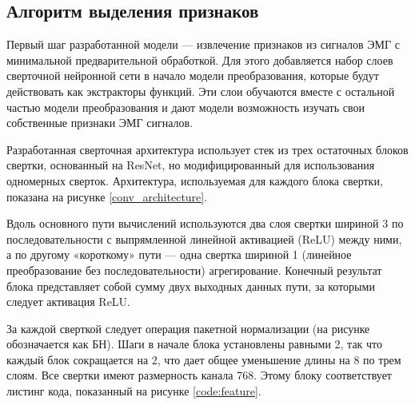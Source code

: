 \subsection{Алгоритм выделения признаков}

Первый шаг разработанной модели — извлечение признаков из сигналов ЭМГ с минимальной предварительной обработкой. Для этого добавляется набор слоев сверточной нейронной сети в начало модели преобразования, которые будут действовать как экстракторы функций. Эти слои обучаются вместе с остальной частью модели преобразования и дают модели возможность изучать свои собственные признаки ЭМГ сигналов.

Разработанная сверточная архитектура использует стек из трех остаточных блоков свертки, основанный на ResNet, но модифицированный для использования одномерных сверток. Архитектура, используемая для каждого блока свертки, показана на рисунке \ref{conv_architecture}. 

\vspace{1.5em}

Вдоль основного пути вычислений используются два слоя свертки шириной 3 по последовательности с выпрямленной линейной активацией (ReLU) между ними, а по другому «короткому» пути — одна свертка шириной 1 (линейное преобразование без последовательности) агрегирование. Конечный результат блока представляет собой сумму двух выходных данных пути, за которыми следует активация ReLU.

За каждой сверткой следует операция пакетной нормализации (на рисунке обозначается как БН). Шаги в начале блока установлены равными 2, так что каждый блок сокращается на 2, что дает общее уменьшение длины на 8 по трем слоям. Все свертки имеют размерность канала 768. Этому блоку соответствует листинг кода, показанный на рисунке \ref{code:feature}.


